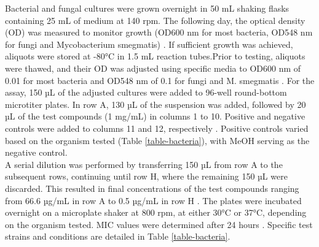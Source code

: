 Bacterial and fungal cultures were grown overnight in 50 mL shaking flasks containing 25 mL of medium at 140 rpm. The following day, the optical density (OD) was measured to monitor growth (OD600 nm for most bacteria, OD548 nm for fungi and Mycobacterium smegmatis) \cite{Ellens}. If sufficient growth was achieved, aliquots were stored at -80°C in 1.5 mL reaction tubes.Prior to testing, aliquots were thawed, and their OD was adjusted using specific media to OD600 nm of 0.01 for most bacteria and OD548 nm of 0.1 for fungi and M. smegmatis \cite{Harms2021}. For the assay, 150 µL of the adjusted cultures were added to 96-well round-bottom microtiter plates. In row A, 130 µL of the suspension was added, followed by 20 µL of the test compounds (1 mg/mL) in columns 1 to 10. Positive and negative controls were added to columns 11 and 12, respectively \cite{Harms2021}. Positive controls varied based on the organism tested (Table \ref{table-bacteria}), with MeOH serving as the negative control.\\

A serial dilution was performed by transferring 150 µL from row A to the subsequent rows, continuing until row H, where the remaining 150 µL were discarded. This resulted in final concentrations of the test compounds ranging from 66.6 µg/mL in row A to 0.5 µg/mL in row H . The plates were incubated overnight on a microplate shaker at 800 rpm, at either 30°C or 37°C, depending on the organism tested. MIC values were determined after 24 hours \cite{Harms2021}. Specific test strains and conditions are detailed in Table \ref{table-bacteria}.\\


    

